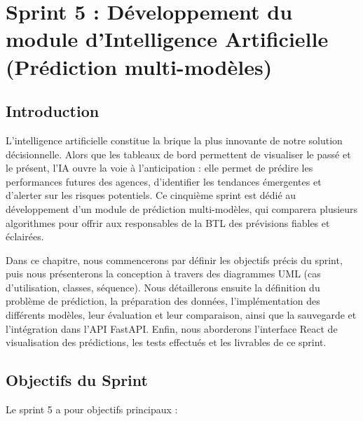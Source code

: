 \chapter{Sprint 5 : Développement du module d'Intelligence Artificielle (Prédiction multi-modèles)}
\label{chap:sprint5-ia}

\section*{Introduction}

L'intelligence artificielle constitue la brique la plus innovante de notre solution décisionnelle. Alors que les tableaux de bord permettent de visualiser le passé et le présent, l'IA ouvre la voie à l'anticipation : elle permet de prédire les performances futures des agences, d'identifier les tendances émergentes et d'alerter sur les risques potentiels. Ce cinquième sprint est dédié au développement d'un module de prédiction multi-modèles, qui comparera plusieurs algorithmes pour offrir aux responsables de la BTL des prévisions fiables et éclairées.

Dans ce chapitre, nous commencerons par définir les objectifs précis du sprint, puis nous présenterons la conception à travers des diagrammes UML (cas d'utilisation, classes, séquence). Nous détaillerons ensuite la définition du problème de prédiction, la préparation des données, l'implémentation des différents modèles, leur évaluation et leur comparaison, ainsi que la sauvegarde et l'intégration dans l'API FastAPI. Enfin, nous aborderons l'interface React de visualisation des prédictions, les tests effectués et les livrables de ce sprint.

\section{Objectifs du Sprint}
\label{sec:sprint5-objectifs}

Le sprint 5 a pour objectifs principaux :

